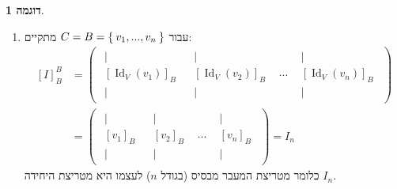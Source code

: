 \documentclass[12pt]{report}
\theoremstyle{plain}
\theoremstyle{definition}
\newtheorem{example}{דוגמה}[chapter]
\newcommand{\0}{\mathbf{0}}
\DeclareMathOperator{\Id}{Id}
\begin{document}
\begin{example}\
\begin{enumerate}[label=\alph*.]
\item
עבור
$C=B=\Set{v_1,...,v_n}$
מתקיים:
$$
\begin{aligned}
[I]_B^B&=\begin{pmatrix}
\begin{array}{c}
|\\[-0.4ex]
[\Id_V(v_1)]_B\\[-0.4ex]
|
\end{array}
&
\begin{array}{c}
|\\[-0.4ex]
[\Id_V(v_2)]_B\\[-0.4ex]
|
\end{array}
&
\cdots
&
\begin{array}{c}
|\\[-0.4ex]
[\Id_V(v_n)]_B\\[-0.4ex]
|
\end{array}
\end{pmatrix}\\
&=\begin{pmatrix}
\begin{array}{c}
|\\[-0.4ex]
[v_1]_B\\[-0.4ex]
|
\end{array}
&
\begin{array}{c}
|\\[-0.4ex]
[v_2]_B\\[-0.4ex]
|
\end{array}
&
\cdots
&
\begin{array}{c}
|\\[-0.4ex]
[v_n]_B\\[-0.4ex]
|
\end{array}
\end{pmatrix}=I_n
\end{aligned}
$$
כלומר מטריצת המעבר מבסיס (בגודל
$n$)
לעצמו היא מטריצת היחידה
$I_n$.



\end{enumerate}
\end{example}
\end{document}
